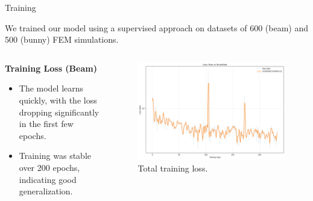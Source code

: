 \documentclass{beamer}
\begin{document}
\begin{frame}{Training}
    
    We trained our model using a supervised approach on datasets of 600 (beam) and 500 (bunny) FEM simulations.
    
\begin{columns}
    
    \begin{column}{0.5\textwidth}
            \textbf{Training Loss (Beam)}
            \begin{itemize}
                \item The model learns quickly, with the loss dropping significantly in the first few epochs.
                \item Training was stable over 200 epochs, indicating good generalization.
            \end{itemize}
    \end{column}
    \begin{column}{0.5\textwidth}
            \begin{figure}
                \includegraphics[width=\textwidth]{Images/training_loss_smoothed_logy.png}
                \caption{Total training loss.}
            \end{figure}

    \end{column}
        
\end{columns}

\end{frame}
\end{document}
